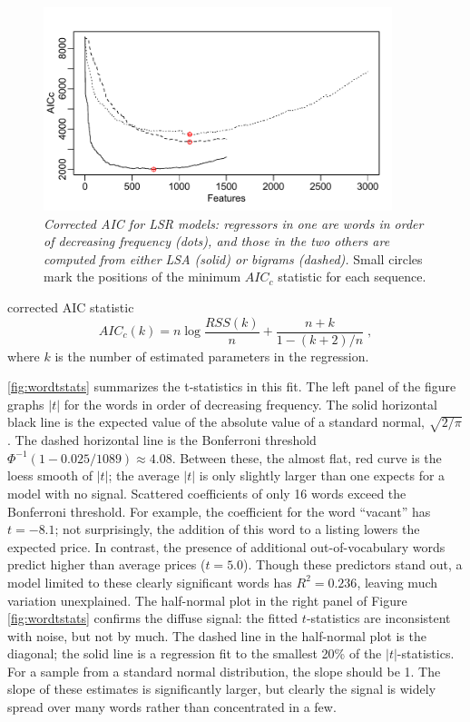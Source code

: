 \documentclass[12pt]{article}
\begin{document}
\begin{figure}
\caption{  \label{fig:aic}  
  {\sl Corrected AIC for LSR models: regressors in one are words in order of
 decreasing frequency (dots), and those in the two others are computed from either
 LSA (solid) or bigrams (dashed).}  Small circles mark the positions of the
 minimum $AIC_c$ statistic for each sequence.}  
 \centerline{\includegraphics[width=4in]{figures/aic.pdf} }
\end{figure}

 
 corrected AIC statistic \citep{hurvich89}
 \begin{equation}
    AIC_{c}(k) = n \log \frac{RSS(k)}{n} + \frac{n+k}{1-(k+2)/n} \;,
 \end{equation}
 where $k$ is the number of estimated parameters in the regression.  

 \ref{fig:wordtstats} summarizes the t-statistics in this fit. The left panel of
 the figure graphs $|t|$ for the words in order of decreasing frequency.  The
 solid horizontal black line is the expected value of the absolute value of a
 standard normal, $\sqrt{2/\pi}$. The dashed horizontal line is the Bonferroni
 threshold $\Phi^{-1}(1-0.025/1089) \approx 4.08$.  Between these, the almost
 flat, red curve is the loess smooth of $|t|$; the average $|t|$ is only slightly
 larger than one expects for a model with no signal.  Scattered coefficients of
 only 16 words exceed the Bonferroni threshold.  For example, the coefficient
 for the word ``vacant'' has $t=-8.1$; not surprisingly, the addition of this
 word to a listing lowers the expected price.  In contrast, the presence of
 additional out-of-vocabulary words predict higher than average prices
 ($t=5.0$).  Though these predictors stand out, a model limited to these clearly
 significant words has $R^2 = 0.236$, leaving much variation unexplained.  The
 half-normal plot in the right panel of Figure \ref{fig:wordtstats} confirms the
 diffuse signal: the fitted $t$-statistics are inconsistent with noise, but not
 by much.  The dashed line in the half-normal plot is the diagonal; the solid line
 is a regression fit to the smallest 20\% of the $|t|$-statistics.  For a sample
 from a standard normal distribution, the slope should be 1.  The slope of these
 estimates is significantly larger, but clearly the signal is widely spread over
 many words rather than concentrated in a few.
   
\end{document}
